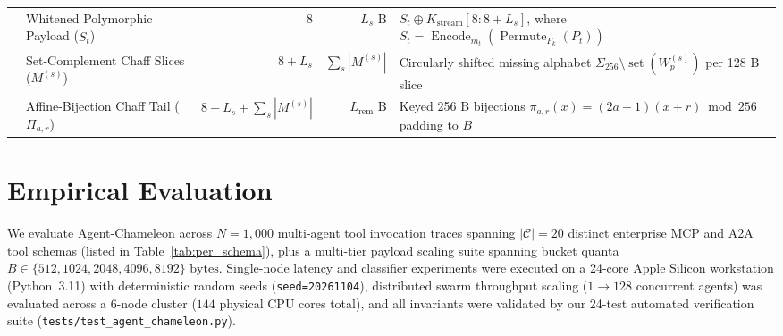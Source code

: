 \documentclass[conference,10pt]{IEEEtran}
\begin{document}
\begin{table}[t!]
{\begin{tabular}{llrrl}
 & Whitened Polymorphic Payload ($\tilde{S}_t$) & $8$ & $L_s\text{ B}$ & $S_t \oplus K_{\text{stream}}[8 : 8 + L_s]$, where $S_t = \operatorname{Encode}_{m_t}(\operatorname{Permute}_{F_k}(P_t))$ \\
 & Set-Complement Chaff Slices ($M^{(s)}$) & $8 + L_s$ & $\sum_s |M^{(s)}|$ & Circularly shifted missing alphabet $\Sigma_{256} \setminus \operatorname{set}(W_p^{(s)})$ per 128 B slice \\
 & Affine-Bijection Chaff Tail ($\Pi_{a,r}$) & $8 + L_s + \sum_s |M^{(s)}|$ & $L_{\text{rem}}\text{ B}$ & Keyed 256 B bijections $\pi_{a,r}(x) = (2a+1)(x+r) \bmod 256$ padding to $B$ \\
\bottomrule
\end{tabular}%
}
\end{table}

\section{Empirical Evaluation}
\label{sec:eval}

We evaluate Agent-Chameleon across $N = 1{,}000$ multi-agent tool invocation traces spanning $|\mathcal{C}| = 20$ distinct enterprise MCP and A2A tool schemas (listed in Table~\ref{tab:per_schema}), plus a multi-tier payload scaling suite spanning bucket quanta $B \in \{512, 1024, 2048, 4096, 8192\}\text{ bytes}$. Single-node latency and classifier experiments were executed on a 24-core Apple Silicon workstation (Python~3.11) with deterministic random seeds (\texttt{seed=20261104}), distributed swarm throughput scaling ($1 \to 128$ concurrent agents) was evaluated across a 6-node cluster ($144$ physical CPU cores total), and all invariants were validated by our 24-test automated verification suite (\texttt{tests/test\_agent\_chameleon.py}).
\end{document}
